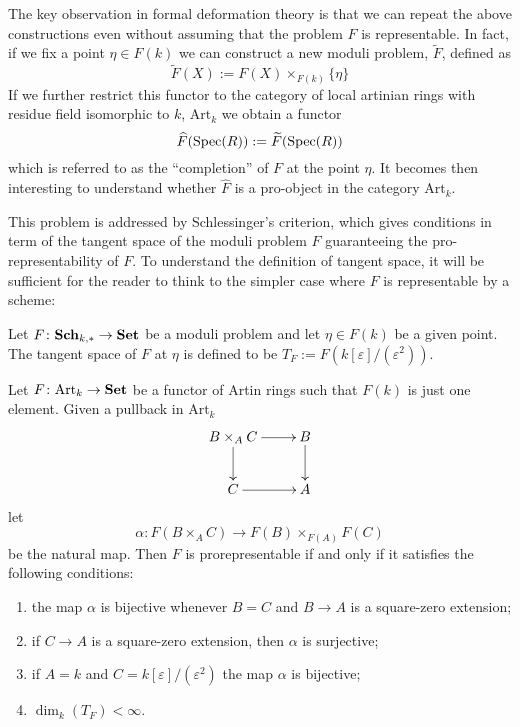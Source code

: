 \begin{refsection}
The key observation in formal deformation theory is that we can repeat the above constructions even without assuming that the problem $F$ is representable. In fact, if we fix a point $\eta \in F(k)$ we can construct a new moduli problem, $\widetilde{F}$, defined as
\[
\widetilde{F}(X) := F(X) \times_{F(k)} \{\eta\}
\]
If we further restrict this functor to the category of local artinian rings with residue field isomorphic to $k$, $\mathrm{Art}_k$ we obtain a functor
\[
\widehat{F}(\mathrm{Spec}(R)) := \widetilde{F}(\mathrm{Spec}(R))
\]
which is referred to as the ``completion'' of $F$ at the point $\eta$. It becomes then interesting to understand whether $\widehat{F}$ is a pro-object in the category $\mathrm{Art}_k$.

This problem is addressed by Schlessinger's criterion, which gives conditions in term of the tangent space of the moduli problem $F$ guaranteeing the pro-representability of $F$. To understand the definition of tangent space, it will be sufficient for the reader to think to the simpler case where $F$ is representable by a scheme:

\begin{defin}
Let $F \colon \mathbf{Sch}_{k,*} \to \mathbf{Set}$ be a moduli problem and let $\eta \in F(k)$ be a given point. The tangent space of $F$ at $\eta$ is defined to be $T_F := F(k[\varepsilon]/(\varepsilon^2))$.
\end{defin}

\begin{thm}[Schlessinger]
Let $F \colon \mathrm{Art}_k \to \mathbf{Set}$ be a functor of Artin rings such that $F(k)$ is just one element. Given a pullback in $\mathrm{Art}_k$
\[
\xymatrix{
B \times_A C \ar[r] \ar[d] & B \ar[d] \\ C \ar[r] & A
}
\]
let
\[
\alpha \colon F(B \times_A C) \to F(B) \times_{F(A)} F(C)
\]
be the natural map. Then $F$ is prorepresentable if and only if it satisfies the following conditions:
\begin{enumerate}
\item the map $\alpha$ is bijective whenever $B = C$ and $B \to A$ is a square-zero extension;
\item if $C \to A$ is a square-zero extension, then $\alpha$ is surjective;
\item if $A = k$ and $C = k[\varepsilon]/(\varepsilon^2)$ the map $\alpha$ is bijective;
\item $\dim_k (T_F) < \infty$.
\end{enumerate}
\end{thm}


\end{refsection}
